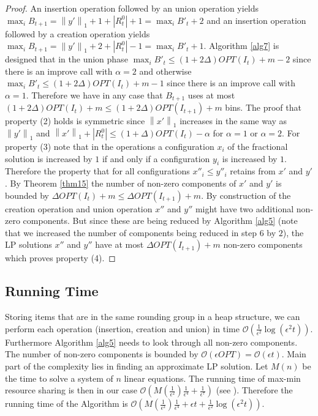 \documentclass[a4paper,11pt]{article}
\newcommand{\nor}[1]{\left\|#1\right\|}
\begin{document}
\begin{proof}
	An insertion operation followed by an union operation yields $\max_i B_{t+1} = \nor{y'}_1 + 1+ |R^{0}_{t}| +1= 
	\max_i B'_t +2$ and an insertion operation followed by a creation operation
	yields $\max_i B_{t+1} = \nor{y'}_1 + 2 +|R^{0}_{t}| -1 = \max_i B'_t +1$. Algorithm \ref{alg7} is designed that in 
	the union phase $\max_i B'_t \leq (1+ 2 \Delta) \mathit{OPT}(I_t) + m - 2$ since there is an improve call with 
	$\alpha =2$ and otherwise
	$\max_i B'_t \leq (1+ 2 \Delta) \mathit{OPT}(I_t) + m - 1$ since there is an improve call with $\alpha = 1$.
	Therefore we have in any case that $B_{t+1}$ uses at most $(1+ 2\Delta)\mathit{OPT}(I_{t}) +m
	\leq (1+ 2\Delta)\mathit{OPT}(I_{t+1}) +m $ bins.
	The proof that property (2) holds is symmetric since $\nor{x'}_1$ increases in the same way as $\nor{y'}_1$ 
	and $\nor{x'}_1 + |R_{t}^0|  \leq (1+ \Delta) \mathit{OPT}(I_t) - \alpha$ for $\alpha=1$ or $\alpha=2$.
	For property (3) note that in the operations a configuration $x_i$ of the fractional solution is increased by $1$ 
	if and only
	if a configuration $y_i$ is increased by $1$. Therefore the property that for all configurations $x''_i \leq y''_i$ 
	retains from $x'$ and $y'$. By Theorem \ref{thm15} the number of non-zero components of $x'$ and $y'$ is bounded 
	by $\Delta \mathit{OPT}(I_t) +m \leq \Delta \mathit{OPT}(I_{t+1}) +m$. 
	By construction of the creation operation and union operation $x''$ and $y''$
	might have two additional non-zero components. But since these are being reduced by Algorithm \ref{alg5} (note that 
	we increased the number of components being reduced in step 6 by $2$), the LP solutions $x''$ and $y''$ 
	have at most $\Delta \mathit{OPT}(I_{t+1}) +m$ non-zero components which proves property (4).
	\end{proof}
\subsection{Running Time}
Storing items that are in the same rounding group in a heap structure, we can perform each operation 
(insertion, creation and union) in time $\mathcal{O}(\frac{1}{\epsilon^2}\log(\epsilon^2 t))$. 
Furthermore Algorithm \ref{alg5} needs to look through all non-zero components. The number of non-zero components is bounded
by $\mathcal{O}(\epsilon \mathit{OPT}) = \mathcal{O}(\epsilon t)$.
Main part of the complexity lies in finding an approximate LP solution.
Let $M(n)$ be the time to solve a system of $n$ linear equations. The running time of
max-min resource sharing is then in our case $\mathcal{O}(M(\frac{1}{\epsilon^2}) \frac{1}{\epsilon^4} + 
\frac{1}{\epsilon^7})$
(see \cite{jansen2004approximation}).
Therefore the running time of the Algorithm is $\mathcal{O}(M(\frac{1}{\epsilon^2}) \frac{1}{\epsilon^4} +
\epsilon t + \frac{1}{\epsilon^2}\log(\epsilon^2 t))$.
\end{document}
